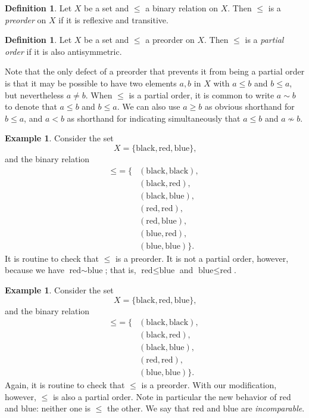 \documentclass[letterpaper]{article}
\theoremstyle{definition}
\newtheorem{definition}[theorem]{Definition}
\newtheorem{example}[theorem]{Example}
\begin{document}
\begin{definition}
  \label{def:preorder}
  Let \(X\) be a set and \(\leq\) a binary relation on \(X\).  Then
  \(\leq\) is a \emph{preorder} on \(X\) if it is reflexive and
  transitive.
\end{definition}

\begin{definition}
  \label{def:partialorder}
  Let \(X\) be a set and \(\leq\) a preorder on \(X\).  Then \(\leq\)
  is a \emph{partial order} if it is also antisymmetric.
\end{definition}

Note that the only defect of a preorder that prevents it from being a
partial order is that it may be possible to have two elements \(a,b\)
in \(X\) with \(a \leq b\) and \(b \leq a\), but nevertheless \(a \neq
b\).  When \(\leq\) is a partial order, it is common to write \(a \sim
b\) to denote that \(a \leq b\) and \(b \leq a\).  We can also use \(a
\geq b\) as obvious shorthand for \(b \leq a\), and \(a < b\) as
shorthand for indicating simultaneously that \(a \leq b\) and \(a
\not\sim b\).

\begin{example}
  \label{example:prenotpartial}
  Consider the set
  \[X = \{\text{black}, \text{red}, \text{blue}\}\text{,}\]
  and the binary relation
  \begin{align*}
    \mathord{\leq} = \{
    &(\text{black}, \text{black}), \\
    &(\text{black}, \text{red}), \\
    &(\text{black}, \text{blue}), \\
    &(\text{red}, \text{red}), \\
    &(\text{red}, \text{blue}), \\
    &(\text{blue}, \text{red}), \\
    &(\text{blue}, \text{blue})
    \} \text{.}
  \end{align*}
  It is routine to check that \(\leq\) is a preorder.  It is not a
  partial order, however, because we have \(\text{red} \sim
  \text{blue}\); that is, \(\text{red} \leq \text{blue}\) and
  \(\text{blue} \leq \text{red}\).
\end{example}

\begin{example}
  \label{example:partialnotlinear}
  Consider the set
  \[X = \{\text{black}, \text{red}, \text{blue}\}\text{,}\]
  and the binary relation
  \begin{align*}
    \mathord{\leq} = \{
    &(\text{black}, \text{black}), \\
    &(\text{black}, \text{red}), \\
    &(\text{black}, \text{blue}), \\
    &(\text{red}, \text{red}), \\
    &(\text{blue}, \text{blue})
    \} \text{.}
  \end{align*}
  Again, it is routine to check that \(\leq\) is a preorder.  With our
  modification, however, \(\leq\) is also a partial order.  Note in
  particular the new behavior of red and blue: neither one is \(\leq\)
  the other.  We say that red and blue are \emph{incomparable}.
\end{example}
\end{document}
